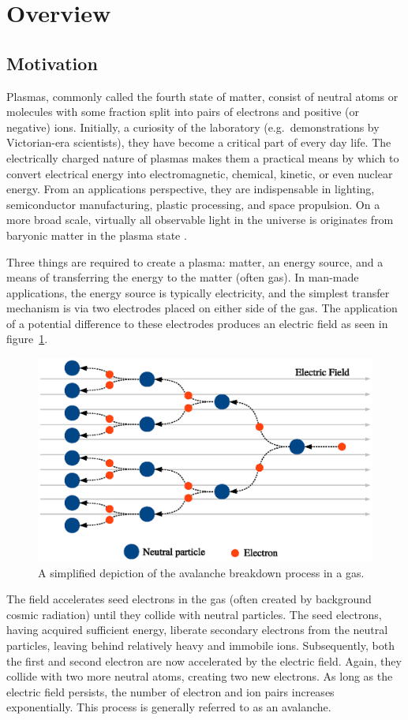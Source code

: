 \section{Overview}

\subsection{Motivation}
Plasmas, commonly called the fourth state of matter, consist of neutral atoms or
molecules with some fraction split into pairs of electrons and positive (or
negative) ions. Initially, a curiosity of the laboratory (e.g.\ demonstrations
by Victorian-era scientists), they have become a critical part of every day
life. The electrically charged nature of plasmas makes them a practical means by
which to convert electrical energy into electromagnetic, chemical, kinetic, or
even nuclear energy. From an applications perspective, they are indispensable in
lighting, semiconductor manufacturing, plastic processing, and space propulsion.
On a more broad scale, virtually all observable light in the universe is
originates from baryonic matter in the plasma state \cite{NA2007}.

Three things are required to create a plasma: matter, an energy source, and a
means of transferring the energy to the matter (often gas). In man-made
applications, the energy source is typically electricity, and the simplest
transfer mechanism is via two electrodes placed on either side of the gas. The
application of a potential difference to these electrodes produces an electric
field as seen in figure~\ref{fig:avalanche}.
\begin{figure}
  \centering
  \includegraphics{./chapters/introduction/figures/avalanche.eps}
  \caption{A simplified depiction of the avalanche breakdown process in a gas.}
  \label{fig:avalanche}
\end{figure}
The field accelerates seed electrons in the gas (often created by background
cosmic radiation) until they collide with neutral particles. The seed electrons,
having acquired sufficient energy, liberate secondary electrons from the neutral
particles, leaving behind relatively heavy and immobile ions. Subsequently, both
the first and second electron are now accelerated by the electric field. Again,
they collide with two more neutral atoms, creating two new electrons. As long as
the electric field persists, the number of electron and ion pairs increases
exponentially. This process is generally referred to as an avalanche.

